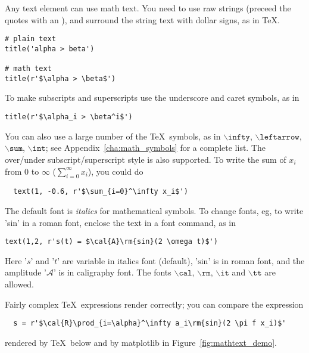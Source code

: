 \documentclass[twoside]{book}
\begin{document}
Any text element can use math text.  You need to use raw strings
(preceed the quotes with an ), and surround the string text
with dollar signs, as in \TeX.

\begin{lstlisting}
# plain text
title('alpha > beta')

# math text
title(r'$\alpha > \beta$')
\end{lstlisting}

\noindent To make subscripts and superscripts use the underscore and caret
symbols, as in

\begin{lstlisting}
title(r'$\alpha_i > \beta^i$')
\end{lstlisting}


You can also use a large number of the \TeX\ symbols, as in
$\mathtt{\backslash infty}$, $\mathtt{\backslash leftarrow}$,
$\mathtt{\backslash sum}$, $\mathtt{\backslash int}$; see
Appendix~\ref{cha:math_symbols} for a complete list.  The over/under
subscript/superscript style is also supported.  To write the sum of
$x_i$ from 0 to $\infty$ ($\sum_{i=0}^\infty x_i$), you could do 

\begin{lstlisting}
  text(1, -0.6, r'$\sum_{i=0}^\infty x_i$')
\end{lstlisting}

The default font is \textit{italics} for mathematical symbols.  To
change fonts, eg, to write 'sin' in a \textrm{roman font}, enclose the
text in a font command, as in

\begin{lstlisting}
text(1,2, r's(t) = $\cal{A}\rm{sin}(2 \omega t)$')
\end{lstlisting}

\noindent Here '$s$' and '$t$' are variable in italics font (default),
'$\mathrm{sin}$' is in roman font, and the amplitude '$\mathcal{A}$'
is in caligraphy font.  The fonts $\mathtt{\backslash cal}$,
$\mathtt{\backslash rm}$, $\mathtt{\backslash it}$ and
$\mathtt{\backslash tt}$ are allowed.

Fairly complex \TeX\ expressions render correctly; you can compare the
expression

\begin{verbatim}
  s = r'$\cal{R}\prod_{i=\alpha}^\infty a_i\rm{sin}(2 \pi f x_i)$'
\end{verbatim}

\noindent rendered by \TeX\ below and by matplotlib in
Figure~\ref{fig:mathtext_demo}.
\end{document}
